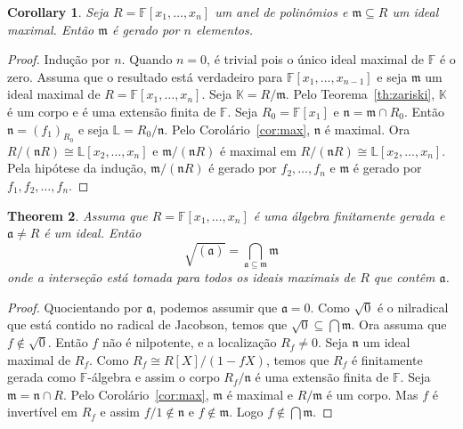 \documentclass[12pt]{amsart}
\renewcommand{\a}{\mathfrak a}
\newcommand{\m}{\mathfrak m}
\newcommand{\n}{\mathfrak n}
\newcommand{\F}{\mathbb F}
\renewcommand{\L}{\mathbb L}
\newcommand{\K}{\mathbb K}
\newtheorem{theorem}{Theorem}
\newtheorem{corollary}[theorem]{Corollary}
\theoremstyle{definition}
\begin{document}
\begin{corollary}
    Seja $R=\F[x_1,\ldots,x_n]$ um anel de polinômios e $\m\subseteq R$ um ideal maximal. Então $\m$ é gerado por $n$ elementos. 
\end{corollary}
\begin{proof}
    Indução por $n$. Quando $n=0$, é trivial pois o único ideal maximal de $\F$ é o zero. Assuma que o resultado está verdadeiro para $\F[x_1,\ldots,x_{n-1}]$ e seja $\m$ um ideal maximal de 
    $R=\F[x_1,\ldots,x_{n}]$. Seja $\K=R/\m$. Pelo Teorema~\ref{th:zariski}, $\K$ é um corpo e é uma extensão finita de 
    $\F$. Seja $R_0=\F[x_1]$ e $\n=\m\cap R_0$. Então $\n=(f_1)_{R_0}$
    e seja $\L=R_0/\n$. 
    Pelo Corolário~\ref{cor:max}, 
    $\n$ é maximal. Ora $R/(\n R)\cong \L[x_2,\ldots,x_n]$ e $\m/(\n R)$ é maximal em 
    $R/(\n R)\cong \L[x_2,\ldots,x_n]$. Pela hipótese da indução, $\m/(\n R)$ é gerado por $f_2,\ldots,f_n$ e 
    $\m$ é gerado por $f_1,f_2,\ldots,f_n$.  
\end{proof}


\begin{theorem}
Assuma que $R=\F[x_1,\ldots,x_n]$ é uma álgebra finitamente gerada e $\a\neq R$ é um ideal. Então 
\[
    \sqrt{(\a)}=\bigcap_{\a\subseteq \m}\m
\]
onde a interseção está tomada para todos os ideais maximais de $R$ que contêm $\a$. 
\end{theorem}
\begin{proof}
    Quocientando por $\a$, podemos assumir que $\a=0$. Como $\sqrt{0}$ é o nilradical que está contido 
    no radical de Jacobson, temos que $\sqrt{0}\subseteq \bigcap \m$. Ora assuma que 
    $f\not\in \sqrt{0}$. Então $f$ não é nilpotente, e a localização $R_f\neq 0$. Seja $\n$ um ideal 
    maximal de $R_f$. Como $R_f\cong R[X]/(1-fX)$, temos que $R_f$ é finitamente gerada como $\F$-álgebra
    e assim o corpo $R_f/\n$ é uma extensão finita de $\F$.  Seja $\m=\n\cap R$. 
Pelo Corolário~\ref{cor:max}, $\m$ é maximal e $R/\m$ é um corpo. Mas $f$ é invertível 
em $R_f$ e assim $f/1\not\in \n$ e $f\not\in\m$. Logo $f\not\in\bigcap\m$.
\end{proof}
\end{document}
